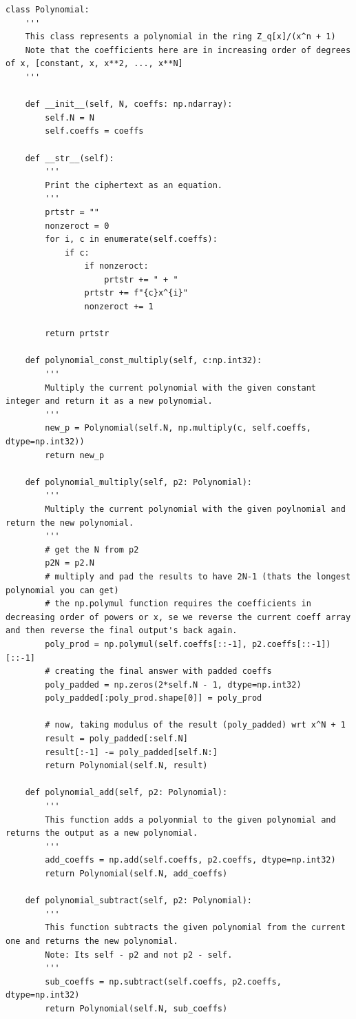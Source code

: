 \documentclass{report}
\begin{document}
\begin{verbatim}
class Polynomial:
	'''
	This class represents a polynomial in the ring Z_q[x]/(x^n + 1)
	Note that the coefficients here are in increasing order of degrees of x, [constant, x, x**2, ..., x**N]
	'''
	
	def __init__(self, N, coeffs: np.ndarray):
		self.N = N
		self.coeffs = coeffs
	
	def __str__(self):
		'''
		Print the ciphertext as an equation.
		'''
		prtstr = ""
		nonzeroct = 0
		for i, c in enumerate(self.coeffs):
			if c:
				if nonzeroct:
					prtstr += " + "
				prtstr += f"{c}x^{i}"
				nonzeroct += 1
		
		return prtstr
	
	def polynomial_const_multiply(self, c:np.int32):
		'''
		Multiply the current polynomial with the given constant integer and return it as a new polynomial.
		'''
		new_p = Polynomial(self.N, np.multiply(c, self.coeffs, dtype=np.int32))
		return new_p
	
	def polynomial_multiply(self, p2: Polynomial):
		'''
		Multiply the current polynomial with the given poylnomial and return the new polynomial.
		'''
		# get the N from p2
		p2N = p2.N
		# multiply and pad the results to have 2N-1 (thats the longest polynomial you can get)
		# the np.polymul function requires the coefficients in decreasing order of powers or x, se we reverse the current coeff array and then reverse the final output's back again.
		poly_prod = np.polymul(self.coeffs[::-1], p2.coeffs[::-1])[::-1]
		# creating the final answer with padded coeffs
		poly_padded = np.zeros(2*self.N - 1, dtype=np.int32)
		poly_padded[:poly_prod.shape[0]] = poly_prod
		
		# now, taking modulus of the result (poly_padded) wrt x^N + 1
		result = poly_padded[:self.N]
		result[:-1] -= poly_padded[self.N:]
		return Polynomial(self.N, result)
	
	def polynomial_add(self, p2: Polynomial):
		'''
		This function adds a polyonmial to the given polynomial and returns the output as a new polynomial.
		'''
		add_coeffs = np.add(self.coeffs, p2.coeffs, dtype=np.int32)
		return Polynomial(self.N, add_coeffs)
		
	def polynomial_subtract(self, p2: Polynomial):
		'''
		This function subtracts the given polynomial from the current one and returns the new polynomial.
		Note: Its self - p2 and not p2 - self.
		'''
		sub_coeffs = np.subtract(self.coeffs, p2.coeffs, dtype=np.int32)
		return Polynomial(self.N, sub_coeffs)
	

\end{verbatim}
\end{document}

